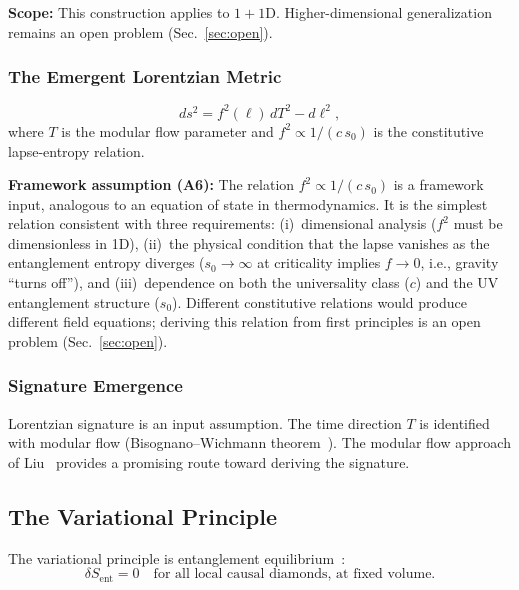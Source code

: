 \documentclass[aps,prd,twocolumn,superscriptaddress,nofootinbib,floatfix]{revtex4-2}
\newcommand{\sn}{s_0}
\newcommand{\Sent}{S_{\mathrm{ent}}}
\begin{document}
\textbf{Scope:} This construction applies to $1{+}1$D. Higher-dimensional generalization remains an open problem (Sec.~\ref{sec:open}).

\subsubsection{The Emergent Lorentzian Metric}

\begin{equation}
\label{eq:metric}
ds^2 = f^2(\ell)\,dT^2 - d\ell^2,
\end{equation}
where $T$ is the modular flow parameter and $f^2 \propto 1/(c\,\sn)$ is the constitutive lapse-entropy relation.

\textbf{Framework assumption (A6):} The relation $f^2 \propto 1/(c\,\sn)$ is a framework input, analogous to an equation of state in thermodynamics. It is the simplest relation consistent with three requirements: (i)~dimensional analysis ($f^2$ must be dimensionless in 1D), (ii)~the physical condition that the lapse vanishes as the entanglement entropy diverges ($\sn \to \infty$ at criticality implies $f \to 0$, i.e., gravity ``turns off''), and (iii)~dependence on both the universality class ($c$) and the UV entanglement structure ($\sn$). Different constitutive relations would produce different field equations; deriving this relation from first principles is an open problem (Sec.~\ref{sec:open}).

\subsubsection{Signature Emergence}

Lorentzian signature is an input assumption. The time direction $T$ is identified with modular flow (Bisognano--Wichmann theorem~\cite{BisognanoWichmann1976}). The modular flow approach of Liu~\cite{Liu2025} provides a promising route toward deriving the signature.

\subsection{The Variational Principle}
\label{sec:variational}

The variational principle is entanglement equilibrium~\cite{Jacobson2016}:
\begin{equation}
\delta\Sent = 0 \quad \text{for all local causal diamonds, at fixed volume.}
\end{equation}
\end{document}
